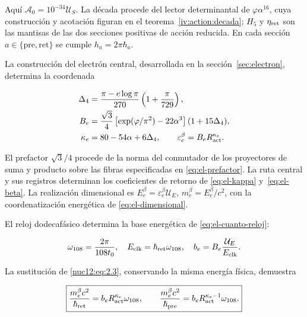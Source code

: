 Aquí \(\mathcal A_0=10^{-34}\mathcal U_S\). La década procede del lector determinantal de \(\varphi\alpha^{16}\), cuya construcción y acotación figuran en el teorema~\ref{iv:action:decada}; \(H_5\) y \(\eta_{\rm ret}\) son las mantisas de las dos secciones positivas de acción reducida. En cada sección \(a\in\{\mathrm{pre},\mathrm{ret}\}\) se cumple \(h_a=2\pi\hbar_a\).

La construcción del electrón central, desarrollada en la sección~\ref{sec:electron}, determina la coordenada



\begin{equation}
\begin{aligned}
\Delta_4&=\frac{\pi-e\log\pi}{270}\left(1+\frac{\pi}{729}\right),\\
B_e&=\frac{\sqrt3}{4}
\left[\exp(\varphi/\pi^2)-22\alpha^3\right](1+15\Delta_4),\\
\kappa_e&=80-54\alpha+6\Delta_4,\qquad
\varepsilon_e^\beta=B_eR_{\rm act}^{\kappa_e}.
\end{aligned}
\label{nuc12:eq:2.3}
\end{equation}



El prefactor \(\sqrt3/4\) procede de la norma del conmutador de los proyectores de suma y producto sobre las fibras especificadas en \eqref{eq:el-prefactor}. La ruta central y sus registros determinan los coeficientes de retorno de \eqref{eq:el-kappa} y~\eqref{eq:el-beta}. La realización dimensional es \(E_e^\beta=\varepsilon_e^\beta\mathcal U_E\), \(m_e^\beta=E_e^\beta/c^2\), con la coordenatización energética de \eqref{eq:el-dimensional}.

El reloj dodecafásico determina la base energética de \eqref{eq:el-cuanto-reloj}:



\[
\omega_{108}=\frac{2\pi}{108t_0},\quad
E_{\rm clk}=\hbar_{\rm ret}\omega_{108},\quad
b_e=B_e\frac{\mathcal U_E}{E_{\rm clk}}.
\]



La sustitución de \eqref{nuc12:eq:2.3}, conservando la misma energía física, demuestra



\begin{equation}
\boxed{\frac{m_e^\beta c^2}{\hbar_{\rm ret}}
=b_eR_{\rm act}^{\kappa_e}\omega_{108},\qquad
\frac{m_e^\beta c^2}{\hbar_{\rm pre}}
=b_eR_{\rm act}^{\kappa_e-1}\omega_{108}.}
\label{nuc12:eq:2.4}
\end{equation}



